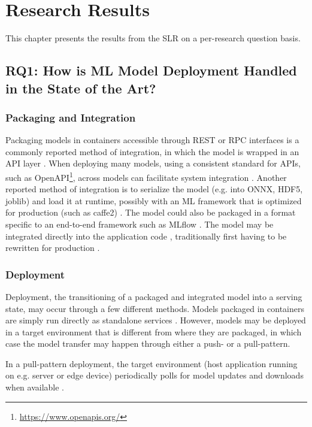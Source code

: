 \chapter{Research Results}
\label{ch:research_results}
This chapter presents the results from the SLR on a per-research question basis.

\section{RQ1: How is ML Model Deployment Handled in the State of the Art?}
\subsection{Packaging and Integration}
Packaging models in containers accessible through REST or RPC interfaces is a commonly reported method of integration, in which the model is wrapped in an API layer \cite{Garcia2020, Li2017, Ruf2021, Crankshaw2017}.
When deploying many models, using a consistent standard for APIs, such as OpenAPI\footnote{\url{https://www.openapis.org/}}, across models can facilitate system integration \cite{Garcia2020}.
Another reported method of integration is to serialize the model (e.g. into ONNX, HDF5, joblib) and load it at runtime, possibly with an ML framework that is optimized for production (such as caffe2) \cite{Hazelwood2018, Peticolas2019, Paeaekkoenen2020, Chahal2020}.
The model could also be packaged in a format specific to an end-to-end framework such as MLflow \cite{Chen2020}.
The model may be integrated directly into the application code \cite{Liu2020, Ruf2021, Granlund2021}, traditionally first having to be rewritten for production \cite{Hazelwood2018}.

\subsection{Deployment}
Deployment, the transitioning of a  packaged and integrated model into a serving state, may occur through a few different methods.
Models packaged in containers are simply run directly as standalone services \cite{Liu2020,Ruf2021, Granlund2021, Li2017, Garcia2020}.
However, models may be deployed in a target environment that is different from where they are packaged, in which case the model transfer may happen through either a push- or a pull-pattern.

In a pull-pattern deployment, the target environment (host application running on e.g. server or edge device) periodically polls for model updates and downloads when available \cite{Paeaekkoenen2020, Li2017, Peticolas2019}.

